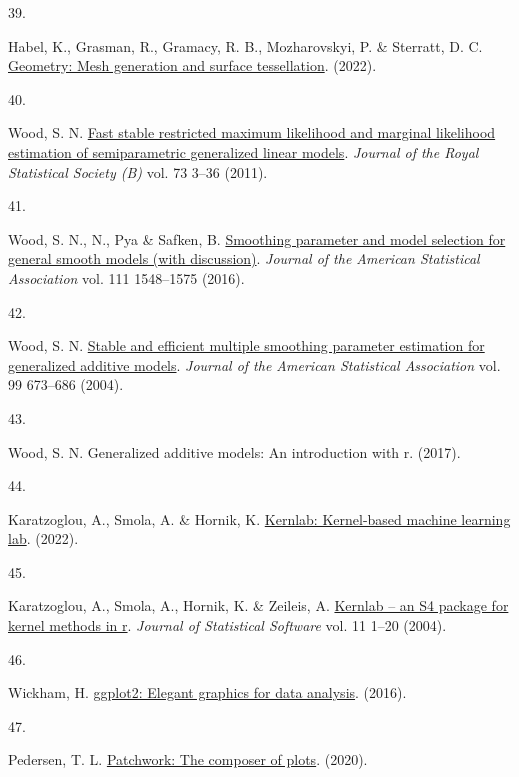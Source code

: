 \documentclass[
  10pt,
]{article}
\newlength{\cslhangindent}
\newlength{\csllabelwidth}
\newlength{\cslentryspacingunit} %
\newenvironment{CSLReferences}[2] %
 {%
  \setlength{\parindent}{0pt}
  \ifodd #1
  \let\oldpar\par
  \def\par{\hangindent=\cslhangindent\oldpar}
  \fi
  \setlength{\parskip}{#2\cslentryspacingunit}
 }%
 {}
\newcommand{\CSLLeftMargin}[1]{\parbox[t]{\csllabelwidth}{#1}}
\newcommand{\CSLRightInline}[1]{\parbox[t]{\linewidth - \csllabelwidth}{#1}\break}
\begin{document}
\begin{CSLReferences}{0}{0}
\leavevmode{}%
\CSLLeftMargin{39. }
\CSLRightInline{Habel, K., Grasman, R., Gramacy, R. B., Mozharovskyi, P. \& Sterratt, D. C. \href{https://CRAN.R-project.org/package=geometry}{Geometry: Mesh generation and surface tessellation}. (2022).}

\leavevmode{}%
\CSLLeftMargin{40. }
\CSLRightInline{Wood, S. N. \href{http://dx.doi.org/10.1111/j.1467-9868.2010.00749.x}{Fast stable restricted maximum likelihood and marginal likelihood estimation of semiparametric generalized linear models}. \emph{Journal of the Royal Statistical Society (B)} vol. 73 3--36 (2011).}

\leavevmode{}%
\CSLLeftMargin{41. }
\CSLRightInline{Wood, S. N., N., Pya \& Safken, B. \href{http://dx.doi.org/10.1080/01621459.2016.1180986}{Smoothing parameter and model selection for general smooth models (with discussion)}. \emph{Journal of the American Statistical Association} vol. 111 1548--1575 (2016).}

\leavevmode{}%
\CSLLeftMargin{42. }
\CSLRightInline{Wood, S. N. \href{http://dx.doi.org/10.1198/016214504000000980}{Stable and efficient multiple smoothing parameter estimation for generalized additive models}. \emph{Journal of the American Statistical Association} vol. 99 673--686 (2004).}

\leavevmode{}%
\CSLLeftMargin{43. }
\CSLRightInline{Wood, S. N. Generalized additive models: An introduction with r. (2017).}

\leavevmode{}%
\CSLLeftMargin{44. }
\CSLRightInline{Karatzoglou, A., Smola, A. \& Hornik, K. \href{https://CRAN.R-project.org/package=kernlab}{Kernlab: Kernel-based machine learning lab}. (2022).}

\leavevmode{}%
\CSLLeftMargin{45. }
\CSLRightInline{Karatzoglou, A., Smola, A., Hornik, K. \& Zeileis, A. \href{https://doi.org/10.18637/jss.v011.i09}{Kernlab -- an S4 package for kernel methods in r}. \emph{Journal of Statistical Software} vol. 11 1--20 (2004).}

\leavevmode{}%
\CSLLeftMargin{46. }
\CSLRightInline{Wickham, H. \href{https://ggplot2.tidyverse.org}{ggplot2: Elegant graphics for data analysis}. (2016).}

\leavevmode{}%
\CSLLeftMargin{47. }
\CSLRightInline{Pedersen, T. L. \href{https://CRAN.R-project.org/package=patchwork}{Patchwork: The composer of plots}. (2020).}


\end{CSLReferences}
\end{document}
